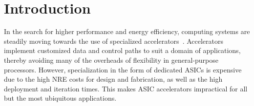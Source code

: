 \section{Introduction}
\label{intro}




In the search for higher performance and energy efficiency, computing
systems are steadily moving towards the use of specialized
accelerators~\cite{dadiannao, casper, q100, linqits, eyeriss, eie, LAP_TC12}. 
Accelerators implement customized data and control paths to
suit a domain of applications, thereby avoiding many of the overheads of
flexibility in general-purpose processors.  However, specialization in
the form of dedicated ASICs is expensive due to the high NRE costs for
design and fabrication, as well as the high deployment and iteration
times. This makes ASIC accelerators impractical for all but the most
ubiquitous applications.

